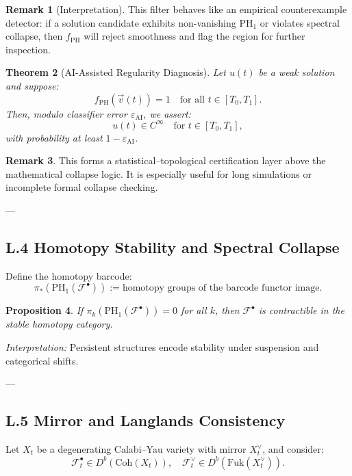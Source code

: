 \documentclass[11pt]{article}
\newtheorem{theorem}{Theorem}[section]
\newtheorem{proposition}[theorem]{Proposition}
\theoremstyle{definition}
\newtheorem{remark}[theorem]{Remark}
\begin{document}
\begin{remark}[Interpretation]
This filter behaves like an empirical counterexample detector:  
if a solution candidate exhibits non-vanishing $\mathrm{PH}_1$ or violates spectral collapse,  
then $f_{\mathrm{PH}}$ will reject smoothness and flag the region for further inspection.
\end{remark}

\begin{theorem}[AI-Assisted Regularity Diagnosis]
Let $u(t)$ be a weak solution and suppose:
\[
f_{\mathrm{PH}}(\vec{v}(t)) = 1 \quad \text{for all } t \in [T_0, T_1].
\]
Then, modulo classifier error $\varepsilon_\mathrm{AI}$, we assert:
\[
u(t) \in C^\infty \quad \text{for } t \in [T_0, T_1],
\]
with probability at least $1 - \varepsilon_\mathrm{AI}$.
\end{theorem}

\begin{remark}
This forms a statistical–topological certification layer above the mathematical collapse logic.  
It is especially useful for long simulations or incomplete formal collapse checking.
\end{remark}

---

\subsection*{L.4 Homotopy Stability and Spectral Collapse}

Define the homotopy barcode:
\[
\pi_*(\mathrm{PH}_1(\mathcal{F}^\bullet)) := \text{homotopy groups of the barcode functor image}.
\]

\begin{proposition}
If \( \pi_k(\mathrm{PH}_1(\mathcal{F}^\bullet)) = 0 \) for all \( k \), then \( \mathcal{F}^\bullet \) is contractible in the stable homotopy category.
\end{proposition}

\textit{Interpretation:} Persistent structures encode stability under suspension and categorical shifts.

---

\subsection*{L.5 Mirror and Langlands Consistency}

Let \( X_t \) be a degenerating Calabi–Yau variety with mirror \( X_t^\vee \), and consider:
\[
\mathcal{F}_t^\bullet \in D^b(\mathrm{Coh}(X_t)), \quad \mathcal{F}_t^\vee \in D^b(\mathrm{Fuk}(X_t^\vee)).
\]
\end{document}
